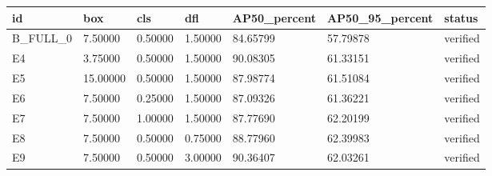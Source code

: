 \begin{tabular}{lllllll}
\hline
id & box & cls & dfl & AP50\_percent & AP50\_95\_percent & status \\
\hline
B\_FULL\_0 & 7.50000 & 0.50000 & 1.50000 & 84.65799 & 57.79878 & verified \\
E4 & 3.75000 & 0.50000 & 1.50000 & 90.08305 & 61.33151 & verified \\
E5 & 15.00000 & 0.50000 & 1.50000 & 87.98774 & 61.51084 & verified \\
E6 & 7.50000 & 0.25000 & 1.50000 & 87.09326 & 61.36221 & verified \\
E7 & 7.50000 & 1.00000 & 1.50000 & 87.77690 & 62.20199 & verified \\
E8 & 7.50000 & 0.50000 & 0.75000 & 88.77960 & 62.39983 & verified \\
E9 & 7.50000 & 0.50000 & 3.00000 & 90.36407 & 62.03261 & verified \\
\hline
\end{tabular}
